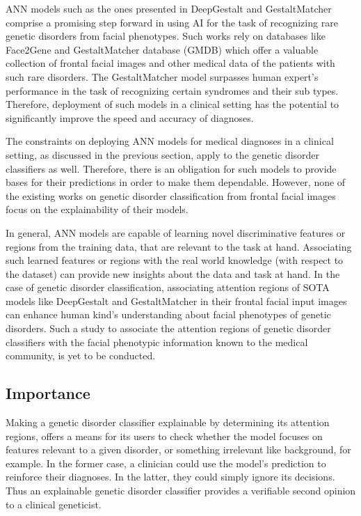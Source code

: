 \documentclass[../report.tex]{subfiles}
\begin{document}
    ANN models such as the ones presented in DeepGestalt \cite{Gurovich2019} and GestaltMatcher \cite{hsieh2022gestaltmatcher} comprise a promising step forward in using AI for the task of recognizing rare genetic disorders from facial phenotypes. Such works rely on databases like Face2Gene \cite{face2gene} and GestaltMatcher database (GMDB) \cite{gmdb}  which offer a valuable collection of frontal facial images and other medical data of the patients with such rare disorders. The GestaltMatcher \cite{hsieh2022gestaltmatcher} model surpasses human expert's performance in the task of recognizing certain syndromes and their sub types. Therefore, deployment of such models in a clinical setting has the potential to significantly improve the speed and accuracy of diagnoses.
    
    The constraints on deploying ANN models for medical diagnoses in a clinical setting, as discussed in the previous section, apply to the genetic disorder classifiers as well. Therefore, there is an obligation for such models to provide bases for their predictions in order to make them dependable. However, none of the existing works on genetic disorder classification from frontal facial images focus on the explainability of their models.
    
    In general, ANN models are capable of learning novel discriminative features or regions from the training data, that are relevant to the task at hand. Associating such learned features or regions with the real world knowledge (with respect to the dataset) can provide new insights about the data and task at hand. In the case of genetic disorder classification, associating attention regions of SOTA models like DeepGestalt \cite{Gurovich2019} and GestaltMatcher \cite{hsieh2022gestaltmatcher} in their frontal facial input images can enhance human kind's understanding about facial phenotypes of genetic disorders. Such a study to associate the attention regions of genetic disorder classifiers with the facial phenotypic information known to the medical community, is yet to be conducted.
    
    \subsection{Importance} \label{sec_importance}
    Making a genetic disorder classifier explainable by determining its attention regions, offers a means for its users to check whether the model focuses on features relevant to a given disorder, or something irrelevant like background, for example. In the former case, a clinician could use the model's prediction to reinforce their diagnoses. In the latter, they could simply ignore its decisions. Thus an explainable genetic disorder classifier provides a verifiable second opinion to a clinical geneticist.
    
\end{document}
